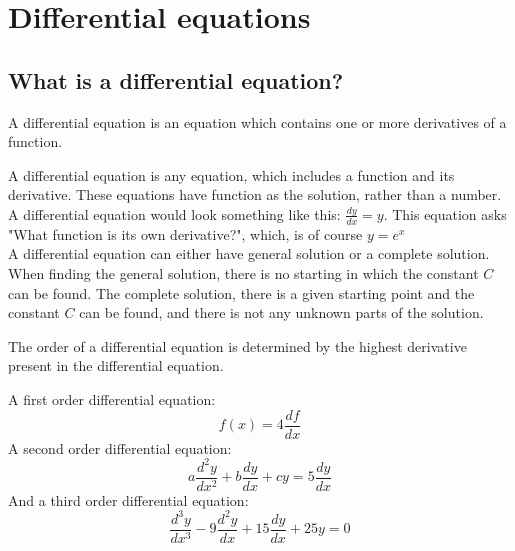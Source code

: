 \chapter{Differential equations}
\section{What is a differential equation?}
\begin{tcolorbox}[colback=blue!5!white,colframe=blue!75!black,title=Definition: Differential equation] 
A differential equation is an equation which contains one or more derivatives of a function.
\end{tcolorbox}
A differential equation is any equation, which includes a function and its derivative. These equations have function as the solution, rather than a number. 
\\
A differential equation would look something like this: $\frac{dy}{dx} = y$. This equation asks "What function is its own derivative?", which, is of course $y=e^x$
\\
A differential equation can either have general solution or a complete solution. When finding the general solution, there is no starting in which the constant $C$ can be found. The complete solution, there is a given starting point and the constant $C$ can be found, and there is not any unknown parts of the solution.
\\
\begin{tcolorbox}[colback=blue!5!white,colframe=blue!75!black,title=Definition: Order of a differential equation]
The order of a differential equation is determined by the highest derivative present in the differential equation.
\end{tcolorbox} 
\begin{tcolorbox}[colback=red!5!white,colframe=red!55!black,title=Example of differential equation of different orders] 
A first order differential equation:
$$f(x)=4\frac{df}{dx} $$
A second order differential equation:
$$a\frac{d^2y}{dx^2}+b\frac{dy}{dx}+cy = 5\frac{dy}{dx}$$
And a third order differential equation:
$$\frac{d^3y}{dx^3} - 9\frac{d^2y}{dx} + 15\frac{dy}{dx} + 25y = 0$$
\end{tcolorbox}
